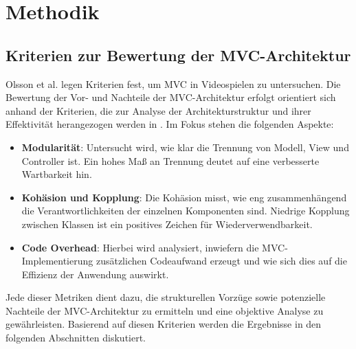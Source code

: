 
\chapter{Methodik}

\section{Kriterien zur Bewertung der MVC-Architektur}

Olsson et al. \cite{olsson2015evolution} legen Kriterien fest, um 
MVC in Videospielen zu untersuchen.
Die Bewertung der Vor- und Nachteile der MVC-Architektur erfolgt orientiert 
sich anhand der Kriterien, die zur Analyse der Architekturstruktur und ihrer 
Effektivität herangezogen werden in \cite{olsson2015evolution}. Im Fokus stehen 
die folgenden Aspekte:

\begin{itemize}
    \item \textbf{Modularität}: Untersucht wird, wie klar die Trennung 
    von Modell, View und Controller ist. Ein hohes Maß an Trennung 
    deutet auf eine verbesserte Wartbarkeit hin.
    
    \item \textbf{Kohäsion und Kopplung}: Die Kohäsion misst, wie 
    eng zusammenhängend die Verantwortlichkeiten der einzelnen 
    Komponenten sind. Niedrige Kopplung zwischen Klassen ist ein 
    positives Zeichen für Wiederverwendbarkeit.
    
    \item \textbf{Code Overhead}: Hierbei wird analysiert, inwiefern 
    die MVC-Implementierung zusätzlichen Codeaufwand erzeugt und 
    wie sich dies auf die Effizienz der Anwendung auswirkt.
\end{itemize}

Jede dieser Metriken dient dazu, die strukturellen Vorzüge sowie 
potenzielle Nachteile der MVC-Architektur zu ermitteln und eine 
objektive Analyse zu gewährleisten. Basierend auf diesen Kriterien 
werden die Ergebnisse in den folgenden Abschnitten diskutiert.